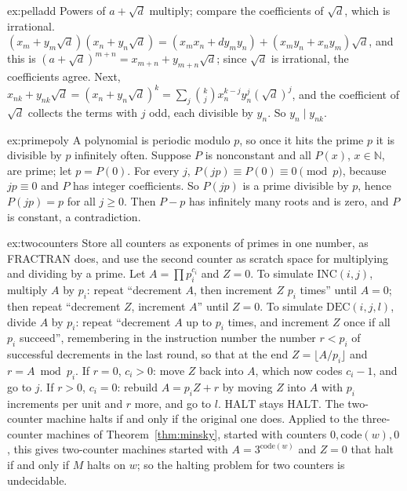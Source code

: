 \begin{solution}{ex:pelladd}
\idea Powers of $a+\sqrt d$ multiply; compare the coefficients of $\sqrt d$, which is irrational.
\writeup $(x_m+y_m\sqrt d)(x_n+y_n\sqrt d)=(x_mx_n+dy_my_n)+(x_my_n+x_ny_m)\sqrt d$, and this is $(a+\sqrt d)^{m+n}=x_{m+n}+y_{m+n}\sqrt d$; since $\sqrt d$ is irrational, the coefficients agree. Next, $x_{nk}+y_{nk}\sqrt d=(x_n+y_n\sqrt d)^k=\sum_j\binom kjx_n^{k-j}y_n^j(\sqrt d)^j$, and the coefficient of $\sqrt d$ collects the terms with $j$ odd, each divisible by $y_n$. So $y_n\mid y_{nk}$.
\end{solution}

\begin{solution}{ex:primepoly}
\idea A polynomial is periodic modulo $p$, so once it hits the prime $p$ it is divisible by $p$ infinitely often.
\writeup Suppose $P$ is nonconstant and all $P(x)$, $x\in\mathbb N$, are prime; let $p=P(0)$. For every $j$, $P(jp)\equiv P(0)\equiv0\pmod p$, because $jp\equiv0$ and $P$ has integer coefficients. So $P(jp)$ is a prime divisible by $p$, hence $P(jp)=p$ for all $j\ge0$. Then $P-p$ has infinitely many roots and is zero, and $P$ is constant, a contradiction.
\end{solution}

\begin{solution}{ex:twocounters}
\idea Store all counters as exponents of primes in one number, as FRACTRAN does, and use the second counter as scratch space for multiplying and dividing by a prime.
\writeup Let $A=\prod p_i^{c_i}$ and $Z=0$. To simulate $\mathrm{INC}(i,j)$, multiply $A$ by $p_i$: repeat ``decrement $A$, then increment $Z$ $p_i$ times'' until $A=0$; then repeat ``decrement $Z$, increment $A$'' until $Z=0$. To simulate $\mathrm{DEC}(i,j,l)$, divide $A$ by $p_i$: repeat ``decrement $A$ up to $p_i$ times, and increment $Z$ once if all $p_i$ succeed'', remembering in the instruction number the number $r<p_i$ of successful decrements in the last round, so that at the end $Z=\lfloor A/p_i\rfloor$ and $r=A\bmod p_i$. If $r=0$, $c_i>0$: move $Z$ back into $A$, which now codes $c_i-1$, and go to $j$. If $r>0$, $c_i=0$: rebuild $A=p_iZ+r$ by moving $Z$ into $A$ with $p_i$ increments per unit and $r$ more, and go to $l$. $\mathrm{HALT}$ stays $\mathrm{HALT}$. The two-counter machine halts if and only if the original one does. Applied to the three-counter machines of Theorem~\ref{thm:minsky}, started with counters $0,\mathrm{code}(w),0$, this gives two-counter machines started with $A=3^{\mathrm{code}(w)}$ and $Z=0$ that halt if and only if $M$ halts on $w$; so the halting problem for two counters is undecidable.
\end{solution}

